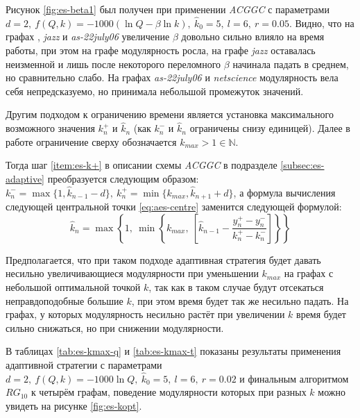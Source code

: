 Рисунок \ref{fig:es-beta1} был получен при применении \emph{ACGGC} с параметрами $d = 2,\ f(Q, k) = -1000(\ln Q - \beta \ln k),\ \hat{k}_0 = 5,\ l = 6,\ r = 0.05$. Видно, что на графах \emph{\celegans}, \emph{jazz} и \emph{as-22july06} увеличение $\beta$ довольно сильно влияло на время работы, при этом на графе \emph{\celegans} модулярность росла, на графе \emph{jazz} оставалась неизменной и лишь после некоторого переломного $\beta$ начинала падать в среднем, но сравнительно слабо. На графах \emph{as-22july06} и \emph{netscience} модулярность вела себя непредсказуемо, но принимала небольшой промежуток значений.

Другим подходом к ограничению времени является установка максимального возможного значения $k_n^{+}$ и $\hat{k}_n$ (как $k_n^{-}$ и $\hat{k}_n$ ограничены снизу единицей). Далее в работе ограничение сверху обозначается $k_{max} > 1 \in \mathbb{N}$.

Тогда шаг \ref{item:es-k+} в описании схемы \emph{ACGGC} в подразделе \ref{subsec:es-adaptive} преобразуется следующим образом: $k_n^{-} = \max\{1, \hat{k}_{n - 1} - d\},\ k_n^{+} = \min \{k_{max}, \hat{k}_{n + 1} + d\}$, а формула вычисления следующей центральной точки \eqref{eq:aes-centre} заменится следующей формулой:
\begin{equation}
	\hat{k}_n = \max \left\{1,\ \min \left\{k_{max},\ \left[\hat{k}_{n - 1} - \frac{y_n^{+} - y_n^{-}}{k_n^{+} - k_n^{-}}\right] \right\} \right\}
\end{equation}

Предполагается, что при таком подходе адаптивная стратегия будет давать несильно увеличивающиеся модулярности при уменьшении $k_{max}$ на графах с небольшой оптимальной точкой $k$, так как в таком случае будут отсекаться неправдоподобные большие $k$, при этом время будет так же несильно падать. На графах, у которых модулярность несильно растёт при увеличении $k$ время будет сильно снижаться, но при снижении модулярности.

В таблицах \ref{tab:es-kmax-q} и \ref{tab:es-kmax-t} показаны результаты применения адаптивной стратегии с параметрами $d = 2,\ f(Q, k) = -1000 \ln Q,\ \hat{k}_0 = 5,\ l = 6,\ r = 0.02$ и финальным алгоритмом $RG_{10}$ к четырём графам, поведение модулярности которых при разных $k$ можно увидеть на рисунке \ref{fig:es-kopt}.

